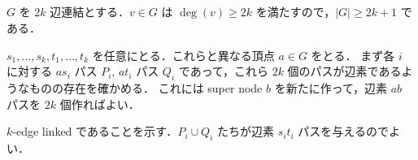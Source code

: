 \subsection{}
$G$ を $2k$ 辺連結とする．$v\in G$ は $\deg(v) \geq 2k$ を満たすので，$|G|\geq 2k + 1$ である．

$s_1,\ldots,s_k,t_1,\ldots,t_k$ を任意にとる．これらと異なる頂点 $a\in G$ をとる．
まず各 $i$ に対する $as_i$ パス $P_i$, $at_i$ パス $Q_i$ であって，これら $2k$ 個のパスが辺素であるようなものの存在を確かめる．
これには super node $b$ を新たに作って，辺素 $ab$ パスを $2k$ 個作ればよい．

$k$-edge linked であることを示す．$P_i\cup Q_i$ たちが辺素 $s_it_i$ パスを与えるのでよい．